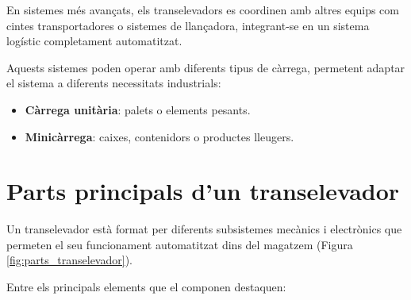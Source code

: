 \documentclass[12pt,a4paper]{report}
\begin{document}
En sistemes més avançats, els transelevadors es coordinen amb altres equips com cintes transportadores o sistemes de llançadora, integrant-se en un sistema logístic completament automatitzat.

Aquests sistemes poden operar amb diferents tipus de càrrega, permetent adaptar el sistema a diferents necessitats industrials:

\begin{itemize}
    \item \textbf{Càrrega unitària}: palets o elements pesants.
    \item \textbf{Minicàrrega}: caixes, contenidors o productes lleugers.
\end{itemize}

\section{Parts principals d'un transelevador}

Un transelevador està format per diferents subsistemes mecànics i electrònics que permeten el seu funcionament automatitzat dins del magatzem (Figura \ref{fig:parts_transelevador}).

Entre els principals elements \cite{transelevador_info} que el componen destaquen:
\end{document}
